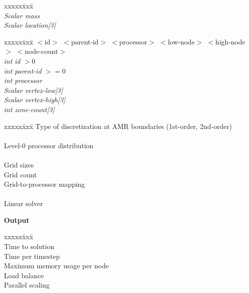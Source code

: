 \documentclass[11pt]{article}
\begin{document}
\begin{tabbing}
xxxxx\=xxx\=\kill
\> \done {} \\
\>\> \textit{Scalar mass} \\
\>\> \textit{Scalar location[3]}
\end{tabbing}

\begin{tabbing}
xxxxx\=xxx\=\kill
\>  $<$id$>$ $<$parent-id$>$ $<$processor$>$ $<$low-node$>$ $<$high-node$>$ $<$node-count$>$ \\
\> \> \textit{int id} $> 0$ \\
\> \> \textit{int parent-id} $>= 0$  \\
\> \> \textit{int processor} \\
\> \> \textit{Scalar vertex-low}\textit{[3]} \\
\> \> \textit{Scalar vertex-high}\textit{[3]} \\
\> \> \textit{int zone-count}\textit{[3]}
\end{tabbing}

\begin{tabbing}
xxxxx\=xxx\=\kill
\> \todo \>   Type of discretization at AMR boundaries (1st-order, 2nd-order) \\
 \\
\> \todo \>    Level-0 processor distribution \\
 \\
\> \todo \>    Grid sizes \\
\> \todo \>    Grid count \\
\> \todo \>    Grid-to-processor mapping \\
 \\
\> \todo \>    Linear solver \\
\end{tabbing}

\textbf{Output}

\begin{tabbing}
xxxxx\=xxx\=\kill\\ 
\> \todo \>    Time to solution \\
\> \todo \>    Time per timestep \\
\> \todo \>    Maximum memory usage per node \\
\> \todo \>    Load balance \\
\> \todo \>    Parallel scaling \\
\end{tabbing}


\end{document}
